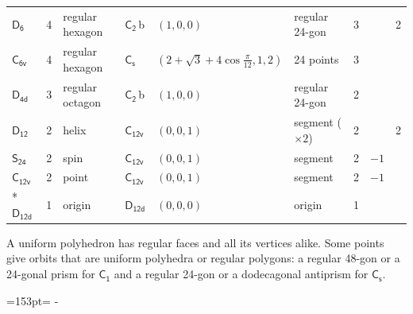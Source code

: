 \documentclass[10pt,a4paper]{article}
\newcommand{\needspace}[1]{\par\penalty-100\begingroup\dimen0=#1\relax\dimen2=\pagegoal
  \advance\dimen2-\pagetotal\ifdim\dimen0>\dimen2\relax\ifdim\dimen2>0pt\vfil\break\fi\fi
  \endgroup}
\numberwithin{equation}{section}
\newcommand{\grp}[1]{\mathsf{#1}}
\newcommand{\clsletter}[1]{\,{\scriptsize\color{black!55}#1}}
\newlength{\fillwidth}\newlength{\cellwidth}\newlength{\colwidth}
\begin{document}
{{\begin{longtable}{@{}lrllllr>{\RaggedRight\arraybackslash}p{\fillwidth}r@{}}
\href{D6.pdf}{$\grp{D_{6}}$} & 4 & regular hexagon & \href{C2.pdf}{$\grp{C_{2}}$}\clsletter{b} & $(1, 0, 0)$ & regular 24-gon & 3 &  & 2\\
\href{C6v.pdf}{$\grp{C_{6v}}$} & 4 & regular hexagon & \href{C1v.pdf}{$\grp{C_{s}}$} & $(2 + \sqrt{3} + 4\cos\tfrac{\pi}{12}, 1, 2)$ & 24 points & 3 &  & \\
\href{D4d.pdf}{$\grp{D_{4d}}$} & 3 & regular octagon & \href{C2.pdf}{$\grp{C_{2}}$}\clsletter{b} & $(1, 0, 0)$ & regular 24-gon & 2 &  & \\
\href{D12.pdf}{$\grp{D_{12}}$} & 2 & helix & \href{C12v.pdf}{$\grp{C_{12v}}$} & $(0, 0, 1)$ & segment (${\times}2$) & 2 &  & 2\\
\href{S24.pdf}{$\grp{S_{24}}$} & 2 & spin & \href{C12v.pdf}{$\grp{C_{12v}}$} & $(0, 0, 1)$ & segment & 2 & ${-1}$ & \\
\href{C12v.pdf}{$\grp{C_{12v}}$} & 2 & point & \href{C12v.pdf}{$\grp{C_{12v}}$} & $(0, 0, 1)$ & segment & 2 & ${-1}$ & \\*
\href{D12d.pdf}{$\grp{D_{12d}}$} & 1 & origin & \href{D12d.pdf}{$\grp{D_{12d}}$} & $(0, 0, 0)$ & origin & 1 &  & \\
\bottomrule\end{longtable}}}
A uniform polyhedron has regular faces and all its vertices alike. Some points give orbits that are uniform polyhedra or regular polygons: a regular 48-gon or a 24-gonal prism for \href{C1.pdf}{$\grp{C_{1}}$} and a regular 24-gon or a dodecagonal antiprism for \href{C1v.pdf}{$\grp{C_{s}}$}.
\needspace{153pt}
\end{document}
